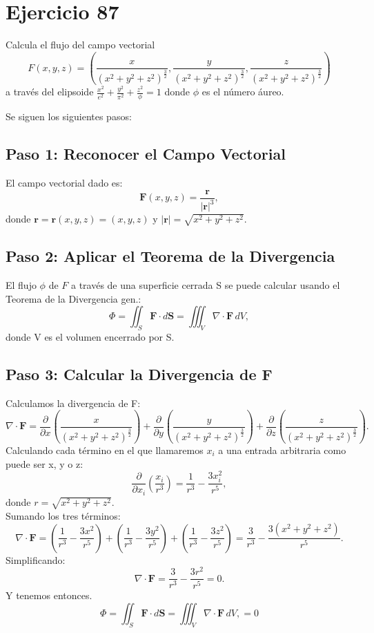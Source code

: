 \section{Ejercicio 87}
Calcula el flujo del campo vectorial
\[
F(x, y, z)=\left(\frac{x}{\left(x^{2}+y^{2}+z^{2}\right)^{\frac{3}{2}}}, \frac{y}{\left(x^{2}+y^{2}+z^{2}\right)^{\frac{3}{2}}}, \frac{z}{\left(x^{2}+y^{2}+z^{2}\right)^{\frac{3}{2}}}\right)
\]
a través del elipsoide \( \frac{x^{2}}{e^{2}}+\frac{y^{2}}{\pi^{2}}+\frac{z^{2}}{\phi}=1 \) donde \( \phi \) es el número áureo.\\

\begin{solution}
Se siguen los siguientes pasos:\\

\subsection{Paso 1: Reconocer el Campo Vectorial}
El campo vectorial dado es:
\[
\mathbf{F}(x, y, z) = \frac{\mathbf{r}}{|\mathbf{r}|^{3}},
\]
donde \( \mathbf{r} = \mathbf{r}(x,y,z) = (x, y, z) \) y \( |\mathbf{r}| = \sqrt{x^{2} + y^{2} + z^{2}} \). \\

\subsection{Paso 2: Aplicar el Teorema de la Divergencia}
El flujo $\phi$ de $F$ a través de una superficie cerrada S se puede calcular usando el Teorema de la Divergencia gen.:
\[
\Phi = \iint_{S} \mathbf{F} \cdot d\mathbf{S} = \iiint_{V} \nabla \cdot \mathbf{F} \, dV,
\]
donde V es el volumen encerrado por S. \\
\subsection{Paso 3: Calcular la Divergencia de F}
Calculamos la divergencia de F:
\[
\nabla \cdot \mathbf{F} = \frac{\partial}{\partial x}\left(\frac{x}{(x^{2}+y^{2}+z^{2})^{\frac{3}{2}}}\right) + \frac{\partial}{\partial y}\left(\frac{y}{(x^{2}+y^{2}+z^{2})^{\frac{3}{2}}}\right) + \frac{\partial}{\partial z}\left(\frac{z}{(x^{2}+y^{2}+z^{2})^{\frac{3}{2}}}\right).
\]
Calculando cada término en el que llamaremos $x_i$ a una entrada arbitraria como puede ser x, y o z:
\[
\frac{\partial}{\partial x_i}\left(\frac{x_i}{r^{3}}\right) = \frac{1}{r^{3}} - \frac{3x_i^{2}}{r^{5}},
\]
donde \( r = \sqrt{x^{2} + y^{2} + z^{2}} \). \\
Sumando los tres términos:
\[
\nabla \cdot \mathbf{F} = \left(\frac{1}{r^{3}} - \frac{3x^{2}}{r^{5}}\right) + \left(\frac{1}{r^{3}} - \frac{3y^{2}}{r^{5}}\right) + \left(\frac{1}{r^{3}} - \frac{3z^{2}}{r^{5}}\right) = \frac{3}{r^{3}} - \frac{3(x^{2}+y^{2}+z^{2})}{r^{5}}.
\]
Simplificando:
\[
\nabla \cdot \mathbf{F} = \frac{3}{r^{3}} - \frac{3r^{2}}{r^{5}} = 0.
\]
Y tenemos entonces.
\[
\Phi = \iint_{S} \mathbf{F} \cdot d\mathbf{S} = \iiint_{V} \nabla \cdot \mathbf{F} \, dV, = 0
\]
\end{solution}